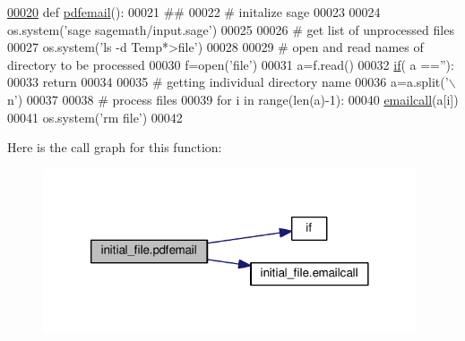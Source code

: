 \begin{DoxyCode}
\hypertarget{namespaceinitial__file_l00020}{}\hyperlink{namespaceinitial__file_a105b1aa7bf4db853b6f4d064ed224030}{00020} \textcolor{keyword}{def }\hyperlink{namespaceinitial__file_a105b1aa7bf4db853b6f4d064ed224030}{pdfemail}():
00021     \textcolor{comment}{##}
00022     \textcolor{comment}{# initalize sage}
00023 
00024     os.system(\textcolor{stringliteral}{'sage sagemath/input.sage'})
00025 
00026     \textcolor{comment}{# get list of unprocessed files}
00027     os.system(\textcolor{stringliteral}{'ls -d Temp*>file'})
00028 
00029     \textcolor{comment}{# open and read names of directory to be processed}
00030     f=open(\textcolor{stringliteral}{'file'})
00031     a=f.read()
00032     \hyperlink{bootstrap_8min_8js_ac2d69f5011896c6ed4a54e0dd36f6334}{if}( a ==\textcolor{stringliteral}{''}):
00033         \textcolor{keywordflow}{return}
00034 
00035     \textcolor{comment}{# getting individual directory name}
00036     a=a.split(\textcolor{stringliteral}{'\(\backslash\)n'})
00037 
00038     \textcolor{comment}{# process files}
00039     \textcolor{keywordflow}{for} i \textcolor{keywordflow}{in} range(len(a)-1):
00040         \hyperlink{namespaceinitial__file_ad9d26ace18fc618ee70df3c0c94927b7}{emailcall}(a[i])
00041     os.system(\textcolor{stringliteral}{'rm file'})
00042 
\end{DoxyCode}


Here is the call graph for this function\+:\nopagebreak
\begin{figure}[H]
\begin{center}
\leavevmode
\includegraphics[width=312pt]{namespaceinitial__file_a105b1aa7bf4db853b6f4d064ed224030_cgraph}
\end{center}
\end{figure}


